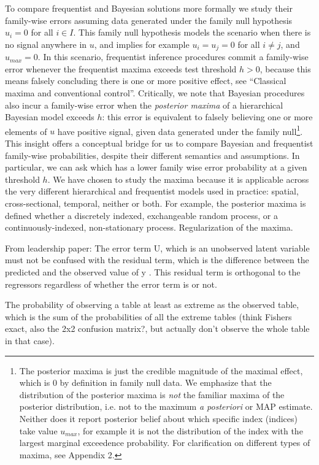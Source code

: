 \documentclass{article}
\begin{document}
To compare frequentist and Bayesian solutions more formally we study their family-wise errors assuming data generated under the family null hypothesis $u_i = 0$ for all $i \in I$. This family null hypothesis models the scenario when there is no signal anywhere in $u$, and implies for example $u_i=u_j=0$ for all $i \neq j$, and $u_{max}=0$. In this scenario, frequentist inference procedures commit a family-wise error whenever the frequentist maxima exceeds test threshold $h>0$, because this means falsely concluding there is one or more positive effect, see ``Classical maxima and conventional control''. Critically, we note that Bayesian procedures also incur a family-wise error when the \textit{posterior maxima} of a hierarchical Bayesian model exceeds $h$: this error is equivalent to falsely believing one or more elements of $u$ have positive signal, given  data generated under the family null\footnote{The posterior maxima is just the credible magnitude of the maximal effect, which is $0$ by definition in family null data. We emphasize that the distribution of the posterior maxima is \textit{not} the familiar maxima of the posterior distribution, i.e. not to the maximum \textit{a posteriori} or MAP estimate. Neither does it report posterior belief about which specific index (indices) take value $u_{max}$, for example it is not the distribution of the index with the largest marginal exceedence probability. For clarification on different types of maxima, see Appendix 2.}. This insight offers a conceptual bridge for us to compare Bayesian and frequentist family-wise probabilities, despite their different semantics and assumptions. In particular, we can ask which has a lower family wise error probability at a given threshold $h$. We have chosen to study the maxima because it is applicable across the very different hierarchical and frequentist models used in practice: spatial, cross-sectional, temporal, neither or both. For example, the posterior maxima is defined whether a discretely indexed, exchangeable random process, or a continuously-indexed, non-stationary process. Regularization of the maxima. 


From leadership paper: The error term U, which is an unobserved latent variable must not be confused with the residual term, which is the difference between the predicted and the observed value of y . This residual term is orthogonal to the regressors regardless of whether the error term is or not.

The probability of observing a table at least as extreme as the observed table, which is the sum of the probabilities of all the extreme tables (think Fishers exact, also the 2x2 confusion matrix?, but actually don't observe the whole table in that case).
\end{document}
